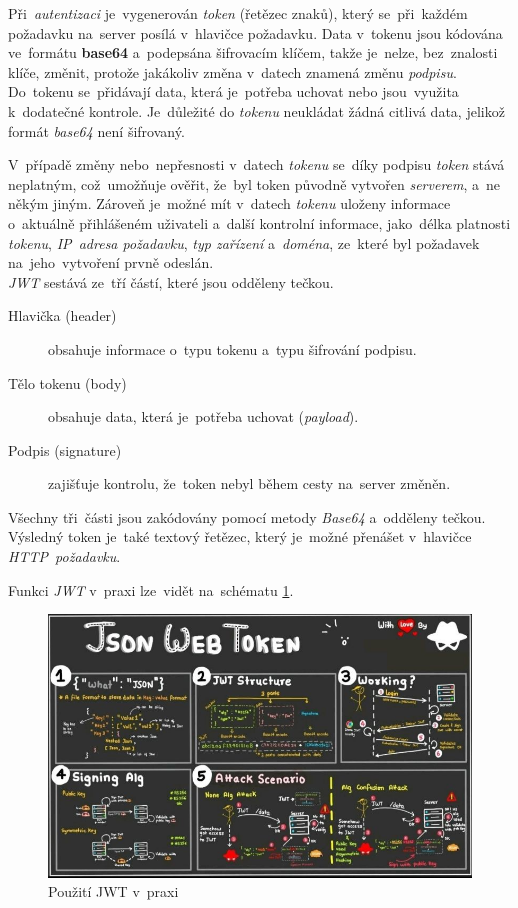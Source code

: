 \documentclass[11pt,a4paper]{report}
\let\oldacrshort\acrshort
\renewcommand{\acrshort}[1]{\emph{\normalsize\color[rgb]{0,0,0}\noindent\oldacrshort{#1}}}
\begin{document}
                Při~\emph{autentizaci} je~vygenerován \emph{token} (řetězec znaků), který se~při~každém požadavku na~server posílá v~hlavičce požadavku. Data v~tokenu jsou kódována ve~formátu \textbf{base64} a~podepsána šifrovacím klíčem, takže je~nelze, bez~znalosti klíče, změnit, protože jakákoliv změna v~datech znamená změnu \emph{podpisu}. Do~tokenu se~přidávají data, která je~potřeba uchovat nebo jsou~využita k~dodatečné kontrole. Je~důležité do \emph{tokenu} neukládat žádná citlivá data, jelikož formát \emph{base64} není šifrovaný. 
                
                V~případě změny nebo~nepřesnosti v~datech \emph{tokenu} se~díky podpisu \emph{token} stává neplatným, což~umožňuje ověřit, že~byl token původně vytvořen \emph{serverem}, a~ne někým jiným. Zároveň je~možné mít v~datech \emph{tokenu} uloženy informace o~aktuálně přihlášeném uživateli a~další kontrolní informace, jako~délka platnosti \emph{tokenu}, \emph{IP~adresa požadavku}, \emph{typ zařízení} a~\emph{doména}, ze~které byl požadavek na~jeho~vytvoření prvně odeslán.\\

                \acrshort{JWT} sestává ze~tří částí, které jsou odděleny tečkou.
                
                \begin{description}
                    \item[Hlavička (header)] obsahuje informace o~typu tokenu a~typu šifrování podpisu.
                    \item[Tělo tokenu (body)] obsahuje data, která je~potřeba uchovat (\emph{payload}).
                    \item[Podpis (signature)] zajišťuje kontrolu, že~token nebyl během cesty na~server změněn.
                \end{description}

                Všechny tři~části jsou zakódovány pomocí metody \emph{Base64} a~odděleny tečkou. Výsledný token je~také textový řetězec, který je~možné přenášet v~hlavičce \emph{HTTP~požadavku}.

                Funkci \acrshort{JWT} v~praxi lze~vidět na~schématu \ref{model-jwt}.

                \begin{figure}
                    \centering
                    \includegraphics[width=.9\linewidth]{./files/img/jwt.jpg}
                    \caption{Použití JWT v~praxi}
                    \label{model-jwt}
                \end{figure}
\end{document}
